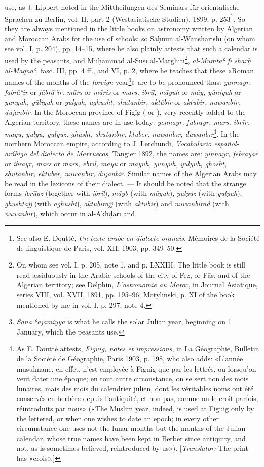 \documentclass[11pt]{article}
\begin{document}
use, as J. Lippert noted in the Mittheilungen des Seminars für orientalische Sprachen zu Berlin, vol. II, part 2 (Westasiatische Studien), 1899, p. 253\footnote{See also E. Doutté, \emph{Un texte arabe en dialecte oranais}, Mémoires de la Société de linguistique de Paris, vol. XII, 1903, pp. 349–50.}. So they are always mentioned in the little books on astronomy written by Algerian and Moroccan Arabs for the use of schools: so Saḥnūn al-Wānsharīshī (on whom see vol. I, p. 204), pp. 14–15, where he also plainly attests that such a calendar is used by the peasants, and Muḥammad al-Sūsī al-Marghītī\footnote{On whom see vol. I, p. 205, note 1, and p. LXXIII. The little book is still read assiduously in the Arabic schools of the city of Fez, or Fās, and of the Algerian territory; see Delphin, \emph{L'astronomie au Maroc}, in Journal Asiatique, series VIII, vol. XVII, 1891, pp. 195–96; Motylinski, p. XI of the book mentioned by me in vol. I, p. 297, note 4.}, \emph{al-Mumtaʿ fī sharḥ al-Maqnaʿ}, fasc. III, pp. 4 ff., and VI, p. 2, where he teaches that these «Roman names of the months of the \emph{foreign} year\footnote{\emph{Sana ʿajamiyya} is what he calls the solar Julian year, beginning on 1 January, which the peasants use.}» are to be pronounced thus: \emph{yannayr, fabrāʾir} or \emph{fābrāʾir, mārs} or \emph{māris} or \emph{mars, ibrīl, māyuh} or \emph{māy, yūniyuh} or \emph{yunyuh, yūliyuh} or \emph{yulyuh, aghusht, shutanbir, aktūbir} or \emph{aktubir, nuwanbir, dujanbir}. In the Moroccan province of Figīg ( or ), very recently added to the Algerian territory, these names are in use today: \emph{yennayr, fubrayr, mars, ibrīr, māyū, yūlyū, yūlyūz, ghusht, shutānbīr, ktūber, nuwānbīr, duwānbīr}\footnote{As E. Doutté attests, \emph{Figuig, notes et impressions}, in La Géographie, Bulletin de la Société de Géographie, Paris 1903, p. 198, who also adds: «L’année musulmane, en effet, n’est employée à Figuig que par les lettrés, ou lorsqu’on veut dater une époque; en tout autre circonstance, on se sert non des mois lunaires, mais des mois du calendrier julien, dont les véritables noms ont été conservés en berbère depuis l’antiquité, et non pas, comme on le croit parfois, réintroduits par nous» («The Muslim year, indeed, is used at Figuig only by the lettered, or when one wishes to date an epoch; in every other circumstance one uses not the lunar months but the months of the Julian calendar, whose true names have been kept in Berber since antiquity, and not, as is sometimes believed, reintroduced by us»). [\emph{Translator:} The print has «crois».]}. In the northern Moroccan empire, according to J. Lerchundi, \emph{Vocabulario español-arábigo del dialecto de Marruecos}, Tangier 1892, the names are: \emph{yinnayr, febrāyar} or \emph{ibrāyr, mars} or \emph{mārs, ebrīl, māyū} or \emph{māyuh, yunyuh, yulyuh, ghosht, shutanbir, ektūber, nuwanbir, dujanbir}. Similar names of the Algerian Arabs may be read in the lexicons of their dialect. — It should be noted that the strange forms \emph{ibrīlaz} (together with \emph{ibrīl}), \emph{māyb} (with \emph{māyuh}), \emph{yulyuz} (with \emph{yulyuh}), \emph{ghushtajj} (with \emph{aghusht}), \emph{aktubirajj} (with \emph{aktubir}) and \emph{nuwanbirad} (with \emph{nuwanbir}), which occur in al-Akhḍarī and 
\end{document}
